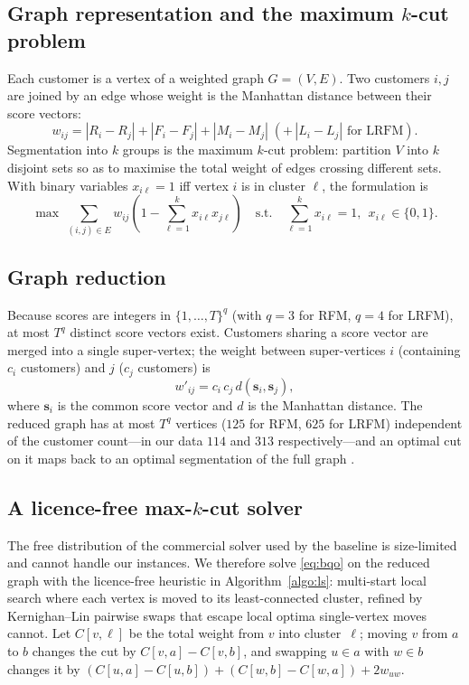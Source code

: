 \documentclass[pdflatex,sn-mathphys-num]{sn-jnl}%
\begin{document}
\subsection{Graph representation and the maximum $k$-cut problem}\label{subsec:graph}
Each customer is a vertex of a weighted graph $G=(V,E)$. Two customers $i,j$ are joined by an edge whose weight is the Manhattan distance between their score vectors:
\begin{equation}
w_{ij}=|R_i-R_j|+|F_i-F_j|+|M_i-M_j|\;(+\,|L_i-L_j|\text{ for LRFM}).\label{eq:weight}
\end{equation}
Segmentation into $k$ groups is the maximum $k$-cut problem: partition $V$ into $k$ disjoint sets so as to maximise the total weight of edges crossing different sets. With binary variables $x_{i\ell}=1$ iff vertex $i$ is in cluster $\ell$, the formulation is
\begin{equation}
\max\ \sum_{(i,j)\in E} w_{ij}\!\left(1-\sum_{\ell=1}^{k} x_{i\ell}x_{j\ell}\right)\quad\text{s.t.}\quad \sum_{\ell=1}^{k} x_{i\ell}=1,\ \ x_{i\ell}\in\{0,1\}.\label{eq:bqo}
\end{equation}

\subsection{Graph reduction}\label{subsec:reduce}
Because scores are integers in $\{1,\dots,T\}^{q}$ (with $q=3$ for RFM, $q=4$ for LRFM), at most $T^{q}$ distinct score vectors exist. Customers sharing a score vector are merged into a single super-vertex; the weight between super-vertices $i$ (containing $c_i$ customers) and $j$ ($c_j$ customers) is
\begin{equation}
w'_{ij}=c_i\,c_j\,d(\mathbf{s}_i,\mathbf{s}_j),\label{eq:reduce}
\end{equation}
where $\mathbf{s}_i$ is the common score vector and $d$ is the Manhattan distance. The reduced graph has at most $T^{q}$ vertices ($125$ for RFM, $625$ for LRFM) independent of the customer count---in our data $114$ and $313$ respectively---and an optimal cut on it maps back to an optimal segmentation of the full graph \cite{vianna2026}.

\subsection{A licence-free max-$k$-cut solver}\label{subsec:solver}
The free distribution of the commercial solver used by the baseline is size-limited and cannot handle our instances. We therefore solve \eqref{eq:bqo} on the reduced graph with the licence-free heuristic in Algorithm~\ref{algo:ls}: multi-start local search where each vertex is moved to its least-connected cluster, refined by Kernighan--Lin pairwise swaps that escape local optima single-vertex moves cannot. Let $C[v,\ell]$ be the total weight from $v$ into cluster~$\ell$; moving $v$ from $a$ to $b$ changes the cut by $C[v,a]-C[v,b]$, and swapping $u\in a$ with $w\in b$ changes it by $(C[u,a]-C[u,b])+(C[w,b]-C[w,a])+2w_{uw}$.
\end{document}
